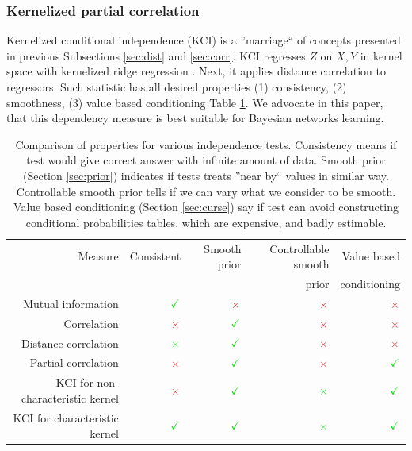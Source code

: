 \documentclass{article} %
\begin{document}
\subsubsection{Kernelized partial correlation}\label{sec:kci}
Kernelized conditional independence (KCI) \cite{zhang2012kernel} is a ''marriage`` of concepts presented in 
previous Subsections \ref{sec:dist} and \ref{sec:corr}. KCI regresses $Z$ on $X, Y$ in kernel space with kernelized
ridge regression \cite{saunders1998ridge}. Next,
it applies distance correlation to regressors. Such statistic has all desired properties (1) consistency, (2) smoothness, 
(3) value based conditioning Table \ref{tab:compar}. We advocate in this paper, that this dependency measure
is best suitable for Bayesian networks learning. 


\begin{table}[t]
\centering
\tiny
\begin{tabular}{rrrrr}
\hline
Measure & Consistent & Smooth prior & Controllable smooth & Value based\\
& & & prior & conditioning\\
\hline
Mutual information & $\color{LimeGreen} \checkmark $ & $\color{Maroon}\times$ & $\color{Maroon}\times$ &   $\color{Maroon}\times$ \\
Correlation & $\color{Maroon}\times$  & $\color{LimeGreen} \checkmark $ & $\color{Maroon}\times$ & $\color{Maroon}\times$ \\
Distance correlation & $\color{LimeGreen}\times$  & $\color{LimeGreen} \checkmark $ & $\color{Maroon}\times$ & $\color{Maroon}\times$ \\
Partial correlation & $\color{Maroon}\times$  & $\color{LimeGreen} \checkmark $ & $\color{Maroon}\times$ & $\color{LimeGreen}\checkmark$ \\
KCI for non-characteristic kernel & $\color{Maroon}\times$  & $\color{LimeGreen} \checkmark $ & $\color{LimeGreen}\times$ & $\color{LimeGreen}\checkmark$ \\
KCI for characteristic kernel & $\color{LimeGreen}\checkmark$  & $\color{LimeGreen} \checkmark $ & $\color{LimeGreen}\times$ & $\color{LimeGreen}\checkmark$ \\
\hline
\end{tabular}
\caption{Comparison of properties for various independence tests. Consistency means if test 
  would give correct answer with infinite amount of data. Smooth prior (Section \ref{sec:prior}) indicates if tests
  treats ''near by`` values in similar way. Controllable smooth prior tells if we
  can vary what we consider to be smooth. Value based conditioning (Section \ref{sec:curse}) 
  say if test can avoid constructing conditional probabilities tables, which are expensive, and
  badly estimable.}
  
\label{tab:compar}
\end{table}
\end{document}
